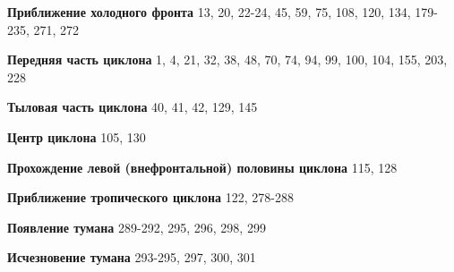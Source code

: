 \textbf{Приближение холодного фронта} 13, 20, 22-24, 45, 59, 75, 108,
120, 134, 179-235, 271, 272

\textbf{Передняя часть циклона} 1, 4, 21, 32, 38, 48, 70, 74, 94, 99,
100, 104, 155, 203, 228

\textbf{Тыловая часть циклона} 40, 41, 42, 129, 145

\textbf{Центр циклона} 105, 130

\textbf{Прохождение левой (внефронтальной) половины циклона} 115, 128

\textbf{Приближение тропического циклона} 122, 278-288

\textbf{Появление тумана} 289-292, 295, 296, 298, 299

\textbf{Исчезновение тумана} 293-295, 297, 300, 301

